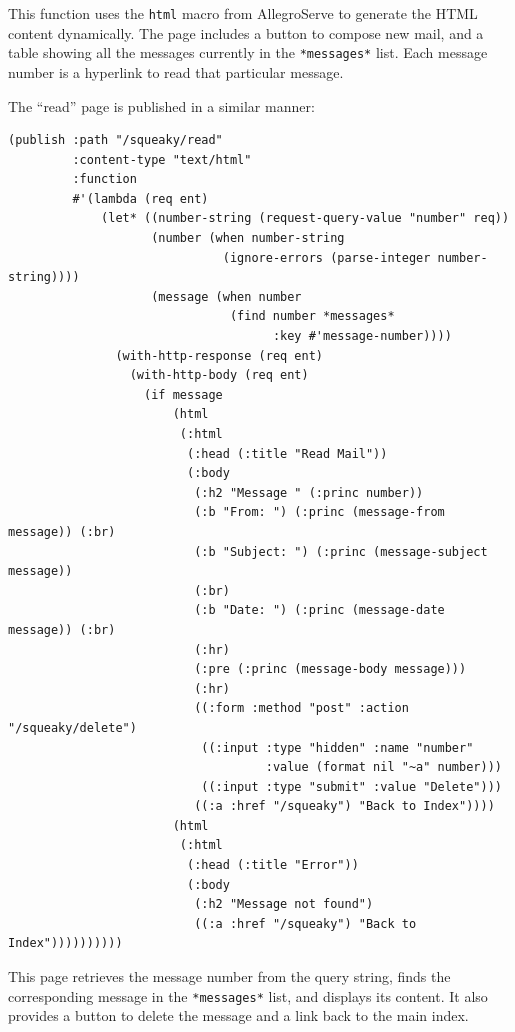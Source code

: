 This function uses the \texttt{html} macro from AllegroServe to generate the HTML content
dynamically. The page includes a button to compose new mail, and a table showing all the
messages currently in the \texttt{*messages*} list. Each message number is a hyperlink to read that
particular message.

The ``read'' page is published in a similar manner:

\begin{verbatim}
(publish :path "/squeaky/read"
         :content-type "text/html"
         :function
         #'(lambda (req ent)
             (let* ((number-string (request-query-value "number" req))
                    (number (when number-string
                              (ignore-errors (parse-integer number-string))))
                    (message (when number
                               (find number *messages*
                                     :key #'message-number))))
               (with-http-response (req ent)
                 (with-http-body (req ent)
                   (if message
                       (html
                        (:html
                         (:head (:title "Read Mail"))
                         (:body
                          (:h2 "Message " (:princ number))
                          (:b "From: ") (:princ (message-from message)) (:br)
                          (:b "Subject: ") (:princ (message-subject message))
                          (:br)
                          (:b "Date: ") (:princ (message-date message)) (:br)
                          (:hr)
                          (:pre (:princ (message-body message)))
                          (:hr)
                          ((:form :method "post" :action "/squeaky/delete")
                           ((:input :type "hidden" :name "number"
                                    :value (format nil "~a" number)))
                           ((:input :type "submit" :value "Delete")))
                          ((:a :href "/squeaky") "Back to Index"))))
                       (html
                        (:html
                         (:head (:title "Error"))
                         (:body
                          (:h2 "Message not found")
                          ((:a :href "/squeaky") "Back to Index"))))))))))
\end{verbatim}

This page retrieves the message number from the query string, finds the corresponding
message in the \texttt{*messages*} list, and displays its content. It also provides a button to
delete the message and a link back to the main index.

